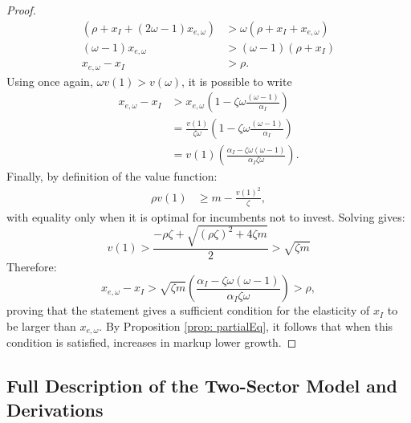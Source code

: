 \begin{proof}
\begin{align*}
\left(\rho+x_{I}+\left(2\omega-1\right)x_{e,\omega}\right) & >\omega\left(\rho+x_{I}+x_{e,\omega}\right)\\
\left(\omega-1\right)x_{e,\omega} & >\left(\omega-1\right)\left(\rho+x_{I}\right)\\
x_{e,\omega}-x_{I} & >\rho.
\end{align*}
Using once again, $\omega v(1)>v(\omega)$, it is possible to write
\begin{align*}
x_{e,\omega}-x_{I} & >x_{e,\omega}\left(1-\zeta\omega\frac{\left(\omega-1\right)}{\alpha_{I}}\right)\\
 & =\frac{v(1)}{\zeta\omega}\left(1-\zeta\omega\frac{\left(\omega-1\right)}{\alpha_{I}}\right)\\
 & =v(1)\left(\frac{\alpha_{I}-\zeta\omega\left(\omega-1\right)}{\alpha_{I}\zeta\omega}\right).
\end{align*}
Finally, by definition of the value function:
\begin{align*}
\rho v(1) & \geq m-\frac{v(1)^{2}}{\zeta},
\end{align*}
with equality only when it is optimal for incumbents not to invest.
Solving gives:
\[
v(1)>\frac{-\rho\zeta+\sqrt{\left(\rho\zeta\right)^{2}+4\zeta m}}{2}>\sqrt{\zeta m}
\]
Therefore:
\[
x_{e,\omega}-x_{I}>\sqrt{\zeta m}\left(\frac{\alpha_{I}-\zeta\omega\left(\omega-1\right)}{\alpha_{I}\zeta\omega}\right)>\rho,
\]
proving that the statement gives a sufficient condition for the elasticity
of $x_{I}$ to be larger than $x_{e,\omega}$. By Proposition \ref{prop: partialEq},
it follows that when this condition is satisfied, increases in markup
lower growth.
\end{proof}


\subsection{Full Description of the Two-Sector Model and Derivations\label{app: twoSec}}

